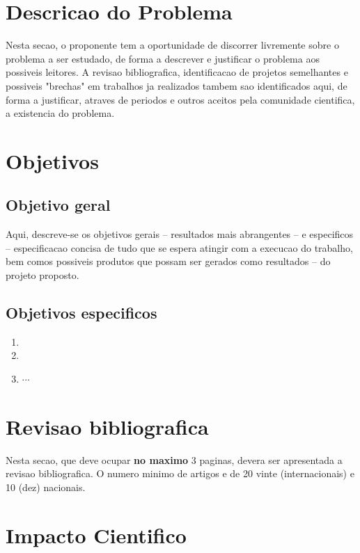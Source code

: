 \documentclass[a4paper,11pt]{article}
\begin{document}
\section{Descricao do Problema}
Nesta secao, o proponente tem a oportunidade de discorrer livremente sobre o problema a ser estudado, de forma a descrever e justificar o problema aos possiveis leitores.  A revisao bibliografica, identificacao de projetos semelhantes e possiveis "brechas" em trabalhos ja realizados tambem sao identificados aqui, de forma a justificar, atraves de periodos e outros aceitos pela comunidade cientifica, a existencia do problema.

\section{Objetivos}

\subsection{Objetivo geral}
Aqui, descreve-se os objetivos gerais -- resultados mais abrangentes -- e especificos -- especificacao concisa de tudo que se espera atingir com a execucao do trabalho, bem comos possiveis produtos que possam ser gerados como resultados -- do projeto proposto. 

\subsection{Objetivos especificos}

\begin{enumerate}
\item 
\item 
 \item $\cdots$

\end{enumerate}

\section{Revisao bibliografica}
Nesta secao, que deve ocupar \textbf{no maximo} 3 paginas, devera ser apresentada a revisao bibliografica. O numero minimo de artigos e de 20 vinte (internacionais) e 10 (dez) nacionais.

\section{Impacto Cientifico}
\end{document}
